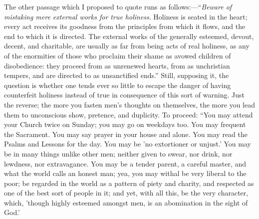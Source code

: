 The other passage which I proposed to quote runs as follows:—``\emph{Beware
of mistaking mere external works for true holiness}. Holiness is
seated in the heart; every act receives its goodness from the
principles from which it flows, and the end to which it is directed.
The external works of the generally esteemed, devout, decent, and
charitable, are usually as far from being acts of real holiness, as
any of the enormities of those who proclaim their shame as avowed
children of disobedience: they proceed from as unrenewed hearts, from
as unchristian tempers, and are directed to as unsanctified
ends.'' Still, supposing it, the question is whether one tends
ever so little to escape the danger of having counterfeit
holiness instead of true in consequence of this sort of warning. Just
the reverse; the more you fasten men's thoughts on themselves, the
more you lead them to unconscious show, pretence, and duplicity. To
proceed: ``You may attend your Church twice on Sunday; you may go
on weekdays too. You may frequent the Sacrament. You may say prayer in
your house and alone. You may read the Psalms and Lessons for the day.
You may be 'no extortioner or unjust.' You may be in many things
unlike other men; neither given to swear, nor drink, nor lewdness, nor
extravagance. You may be a tender parent, a careful master, and what
the world calls an honest man; yea, you may withal be very liberal to
the poor; be regarded in the world as a pattern of piety and charity,
and respected as one of the best sort of people in it; and yet, with
all this, be the very character, which, 'though highly esteemed
amongst men, is an abomination in the sight of God.'

